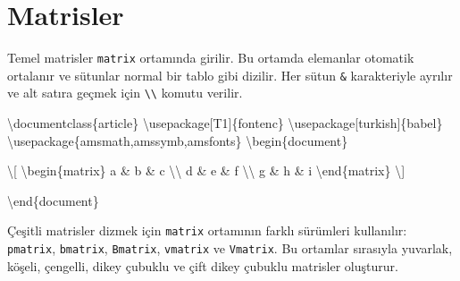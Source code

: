 \documentclass[
  letterpaper,
  DIV=11,
  numbers=noendperiod]{scrreprt}
\newenvironment{Shaded}{\begin{snugshade}}{\end{snugshade}}
\newcommand{\BuiltInTok}[1]{\textcolor[rgb]{0.00,0.23,0.31}{#1}}
\newcommand{\ExtensionTok}[1]{\textcolor[rgb]{0.00,0.23,0.31}{#1}}
\newcommand{\KeywordTok}[1]{\textcolor[rgb]{0.00,0.23,0.31}{#1}}
\newcommand{\NormalTok}[1]{\textcolor[rgb]{0.00,0.23,0.31}{#1}}
\newcommand{\SpecialCharTok}[1]{\textcolor[rgb]{0.37,0.37,0.37}{#1}}
\newcommand{\SpecialStringTok}[1]{\textcolor[rgb]{0.13,0.47,0.30}{#1}}
\begin{document}
\hypertarget{matrisler}{%
\section{Matrisler}\label{matrisler}}

Temel matrisler \texttt{matrix} ortamında girilir. Bu ortamda elemanlar
otomatik ortalanır ve sütunlar normal bir tablo gibi dizilir. Her sütun
\texttt{\&} karakteriyle ayrılır ve alt satıra geçmek için
\texttt{\textbackslash{}\textbackslash{}} komutu verilir.

\begin{Shaded}
\begin{Highlighting}[]
\BuiltInTok{\textbackslash{}documentclass}\NormalTok{\{}\ExtensionTok{article}\NormalTok{\}}
\BuiltInTok{\textbackslash{}usepackage}\NormalTok{[T1]\{}\ExtensionTok{fontenc}\NormalTok{\}}
\BuiltInTok{\textbackslash{}usepackage}\NormalTok{[turkish]\{}\ExtensionTok{babel}\NormalTok{\}}
\BuiltInTok{\textbackslash{}usepackage}\NormalTok{\{}\ExtensionTok{amsmath,amssymb,amsfonts}\NormalTok{\}}
\KeywordTok{\textbackslash{}begin}\NormalTok{\{}\ExtensionTok{document}\NormalTok{\}}

\SpecialStringTok{\textbackslash{}[}
\KeywordTok{\textbackslash{}begin}\NormalTok{\{}\ExtensionTok{matrix}\NormalTok{\}}
\SpecialStringTok{a \& b \& c }\SpecialCharTok{\textbackslash{}\textbackslash{}}
\SpecialStringTok{d \& e \& f }\SpecialCharTok{\textbackslash{}\textbackslash{}}
\SpecialStringTok{g \& h \& i}
\KeywordTok{\textbackslash{}end}\NormalTok{\{}\ExtensionTok{matrix}\NormalTok{\}}
\SpecialStringTok{\textbackslash{}]}

\KeywordTok{\textbackslash{}end}\NormalTok{\{}\ExtensionTok{document}\NormalTok{\}}
\end{Highlighting}
\end{Shaded}

Çeşitli matrisler dizmek için \texttt{matrix} ortamının farklı sürümleri
kullanılır: \texttt{pmatrix}, \texttt{bmatrix}, \texttt{Bmatrix},
\texttt{vmatrix} ve \texttt{Vmatrix}. Bu ortamlar sırasıyla yuvarlak,
köşeli, çengelli, dikey çubuklu ve çift dikey çubuklu matrisler
oluşturur.
\end{document}
